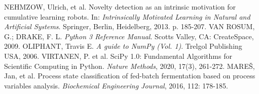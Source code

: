 \documentclass[11pt,twoside,openright]{report}
\begin{document}
\begin{thebibliography}{L}
NEHMZOW, Ulrich, et al. Novelty detection as an intrinsic motivation for cumulative learning robots. In: \textit{Intrinsically Motivated Learning in Natural and Artificial Systems}. Springer, Berlin, Heidelberg, 2013. p. 185-207.
VAN ROSUM, G.; DRAKE, F. L. \textit{Python 3 Reference Manual}. Scotts Valley, CA: CreateSpace, 2009.
OLIPHANT, Travis E. \textit{A guide to NumPy (Vol. 1)}. Trelgol Publishing USA, 2006.
VIRTANEN, P. et al.  SciPy 1.0: Fundamental Algorithms for Scientific Computing in Python. \textit{Nature Methods}, 2020, 17(3), 261-272.
MAREŠ, Jan, et al. Process state classification of fed-batch fermentation based on process variables analysis. \textit{Biochemical Engineering Journal}, 2016, 112: 178-185.

























\end{thebibliography}



\clearpage
{}
\end{document}
